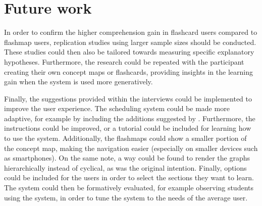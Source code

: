 \section{Future work}

In order to confirm the higher comprehension gain in flashcard users compared to flashmap users, replication studies using larger sample sizes should be conducted. These studies could then also be tailored towards measuring specific explanatory hypotheses. Furthermore, the research could be repeated with the participant creating their own concept maps or flashcards, providing insights in the learning gain when the system is used more generatively.

Finally, the suggestions provided within the interviews could be implemented to improve the user experience. The scheduling system could be made more adaptive, for example by including the additions suggested by . Furthermore, the instructions could be improved, or a tutorial could be included for learning how to use the system. Additionally, the flashmaps could show a smaller portion of the concept map, making the navigation easier (especially on smaller devices such as smartphones). On the same note, a way could be found to render the graphs hierarchically instead of cyclical, as was the original intention. Finally, options could be included for the users in order to select the sections they want to learn. The system could then be formatively evaluated, for example observing students using the system, in order to tune the system to the needs of the average user.
